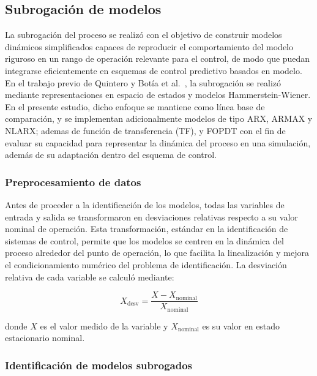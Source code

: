 \subsection{Subrogación de modelos}

La subrogación del proceso se realizó con el objetivo de construir modelos dinámicos simplificados capaces de reproducir el comportamiento del modelo riguroso en un rango de operación relevante para el control, de modo que puedan integrarse eficientemente en esquemas de control predictivo basados en modelo. En el trabajo previo de Quintero y Botía et al.\ \cite{ref10}, la subrogación se realizó mediante representaciones en espacio de estados y modelos Hammerstein-Wiener. En el presente estudio, dicho enfoque se mantiene como línea base de comparación, y se implementan adicionalmente modelos de tipo ARX, ARMAX y NLARX; ademas de función de transferencia (TF), y FOPDT con el fin de evaluar su capacidad para representar la dinámica del proceso en una simulación, además de su adaptación dentro del esquema de control.

\subsubsection{Preprocesamiento de datos}

Antes de proceder a la identificación de los modelos, todas las variables de entrada y salida se transformaron en desviaciones relativas respecto a su valor nominal de operación. Esta transformación, estándar en la identificación de sistemas de control, permite que los modelos se centren en la dinámica del proceso alrededor del punto de operación, lo que facilita la linealización y mejora el condicionamiento numérico del problema de identificación. La desviación relativa de cada variable se calculó mediante:

\begin{equation}
    X_{\text{desv}} = \frac{X - X_{\text{nominal}}}{X_{\text{nominal}}}
    \label{eq:Desviacion}
\end{equation}

\noindent donde $X$ es el valor medido de la variable y $X_{\text{nominal}}$ es su valor en estado estacionario nominal.

\subsubsection{Identificación de modelos subrogados}
\label{subsec:identificacion}

